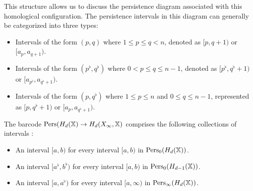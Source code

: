 This structure allows us to discuss the persistence diagram associated with this homological configuration. The persistence intervals in this diagram can generally be categorized into three types:

\begin{itemize}
	\item Intervals of the form $(p, q)$ where $1 \leq p \leq q < n$, denoted as $[p, q+1)$ or $[a_p, a_{q+1})$.
	\item Intervals of the form $(p^\flat, q^\flat)$ where $0 < p \leq q \leq n-1$, denoted as $[p^\flat, q^\flat+1)$ or $[a_{p^\flat}, a_{q^\flat+1})$.
	\item Intervals of the form $(p, q^\flat)$ where $1 \leq p \leq n$ and $0 \leq q \leq n-1$, represented as $[p, q^\flat+1)$ or $[a_p, a_{q^\flat+1})$.
\end{itemize}

\begin{corollary}
The barcode $\text{Pers}(H_d({\mathbb X}) \rightarrow H_d(X_\infty, {\mathbb X})$ comprises the following collections of intervals \cite[§2.5]{de2011dualities}:
\begin{itemize}
	\item An interval $[a,b)$ for every interval $[a,b)$ in $\text{Pers}_0(H_d({\mathbb X}))$.
	\item An interval $[a^\flat, b^\flat)$ for every interval $[a,b)$ in $\text{Pers}_0(H_{d-1}({\mathbb X}))$.
	\item An interval $[a,a^\flat)$ for every interval $[a,\infty)$ in $\text{Pers}_\infty(H_d({\mathbb X}))$.
\end{itemize}
\end{corollary}

